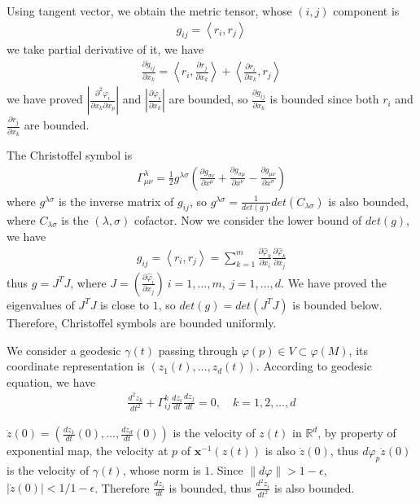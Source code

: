 Using tangent vector, we obtain the metric tensor, whose $(i,j)$ component is 
\begin{align}
	g_{ij}=\left\langle r_i,r_j\right\rangle 
\end{align}
we take partial derivative of it, we have 
\begin{align}
	\frac{\partial g_{ij}}{\partial x_k}=\left\langle r_i , \frac{\partial r_j}{\partial x_k}\right\rangle + \left\langle \frac{\partial r_i}{\partial x_k} , r_j\right\rangle 
\end{align}
we have proved $|\frac{\partial^2  \varphi_i}{\partial x_k \partial x_p}|$ and $|\frac{\partial \varphi_i}{\partial x_k}|$ are bounded, so $\frac{\partial g_{ij}}{\partial x_k}$ is bounded since both $r_i$ and $\frac{\partial r_j}{\partial x_k}$ are bounded.

The Christoffel symbol is 
\begin{align}
	\Gamma^\lambda_{\mu\nu} = \frac{1}{2} g^{\lambda\sigma} \left( \frac{\partial g_{\sigma\nu}}{\partial x^\mu} + \frac{\partial g_{\sigma\mu}}{\partial x^\nu} - \frac{\partial g_{\mu\nu}}{\partial x^\sigma} \right)
\end{align}
where $g^{\lambda \sigma}$ is the inverse matrix of $g_{ij}$, so $g^{\lambda \sigma}=\frac{1}{det(g)} det(C_{\lambda \sigma})$ is also bounded, where $C_{\lambda \sigma}$ is the $(\lambda, \sigma)$ cofactor. Now we consider the lower bound of $det(g)$, we have
\begin{align}
	g_{ij}=\left\langle r_i,r_j\right\rangle = \sum_{k=1}^m \frac{\partial \hat{\varphi}_k}{\partial x_i} \frac{\partial \hat{\varphi}_k}{\partial x_j}
\end{align}
thus $g=J^T J$, where $J=\left(\frac{\partial \hat{\varphi}_i}{\partial x_j}\right)\ i=1,\dots,m, \ j=1,\dots,d
$. We have proved the eigenvalues of $J^TJ$ is close to $1$, so $det(g)= det(J^TJ)$ is bounded below. Therefore, Christoffel symbols are bounded uniformly.




We consider a geodesic $\gamma(t)$ passing through $\varphi(p) \in V \subset \varphi(M)$, its coordinate representation is $(z_1(t),\dots,z_d(t))$. According to geodesic equation, we have 
\begin{align}
	\frac{d^2 z_k}{dt^2}+\Gamma_{ij}^k\frac{dz_i}{dt}\frac{dz_j}{dt}=0, \quad k=1,2,\dots,d
\end{align}

$\dot{z}(0)=(\frac{dz_1}{dt}(0),\dots,\frac{dz_d}{dt}(0))$ is the velocity of $z(t)$ in $\mathbb{R}^d$, by property of exponential map, the velocity at $p$ of $\textbf{x}^{-1}(z(t))$ is also $\dot{z}(0)$, thus $d\varphi_p \dot{z}(0)$ is the velocity of $\gamma(t)$, whose norm is $1$. Since $\|d \varphi\|>1-\epsilon$, $|\dot{z}(0)|<1/1-\epsilon$. Therefore $\frac{dz_i}{dt}$ is bounded, thus $\frac{d^2 z_i}{dt^2}$ is also bounded. 



